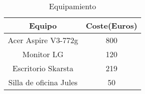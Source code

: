 \begin{table}[h]
    \centering
    \begin{tabular}{|c|c|}
    \hline
    Equipo                 & Coste(Euros) \\ \hline
    Acer Aspire V3-772g    & 800          \\ \hline
    Monitor LG             & 120          \\ \hline
    Escritorio Skarsta     & 219          \\ \hline
    Silla de oficina Jules & 50           \\ \hline
    \end{tabular}
    \caption {Equipamiento}
\end{table}